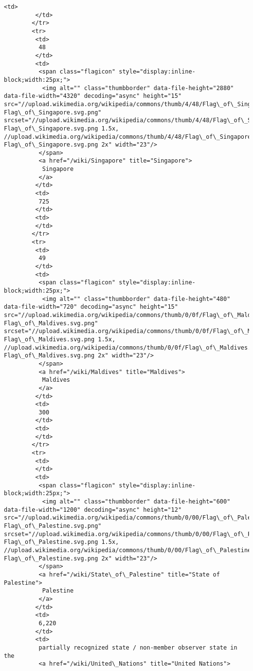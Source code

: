 \documentclass[11pt]{article}
\begin{document}
\begin{Verbatim}[commandchars=\\\{\}]
         <td>
         </td>
        </tr>
        <tr>
         <td>
          48
         </td>
         <td>
          <span class="flagicon" style="display:inline-block;width:25px;">
           <img alt="" class="thumbborder" data-file-height="2880" data-file-width="4320" decoding="async" height="15" src="//upload.wikimedia.org/wikipedia/commons/thumb/4/48/Flag\_of\_Singapore.svg/23px-Flag\_of\_Singapore.svg.png" srcset="//upload.wikimedia.org/wikipedia/commons/thumb/4/48/Flag\_of\_Singapore.svg/35px-Flag\_of\_Singapore.svg.png 1.5x, //upload.wikimedia.org/wikipedia/commons/thumb/4/48/Flag\_of\_Singapore.svg/45px-Flag\_of\_Singapore.svg.png 2x" width="23"/>
          </span>
          <a href="/wiki/Singapore" title="Singapore">
           Singapore
          </a>
         </td>
         <td>
          725
         </td>
         <td>
         </td>
        </tr>
        <tr>
         <td>
          49
         </td>
         <td>
          <span class="flagicon" style="display:inline-block;width:25px;">
           <img alt="" class="thumbborder" data-file-height="480" data-file-width="720" decoding="async" height="15" src="//upload.wikimedia.org/wikipedia/commons/thumb/0/0f/Flag\_of\_Maldives.svg/23px-Flag\_of\_Maldives.svg.png" srcset="//upload.wikimedia.org/wikipedia/commons/thumb/0/0f/Flag\_of\_Maldives.svg/35px-Flag\_of\_Maldives.svg.png 1.5x, //upload.wikimedia.org/wikipedia/commons/thumb/0/0f/Flag\_of\_Maldives.svg/45px-Flag\_of\_Maldives.svg.png 2x" width="23"/>
          </span>
          <a href="/wiki/Maldives" title="Maldives">
           Maldives
          </a>
         </td>
         <td>
          300
         </td>
         <td>
         </td>
        </tr>
        <tr>
         <td>
         </td>
         <td>
          <span class="flagicon" style="display:inline-block;width:25px;">
           <img alt="" class="thumbborder" data-file-height="600" data-file-width="1200" decoding="async" height="12" src="//upload.wikimedia.org/wikipedia/commons/thumb/0/00/Flag\_of\_Palestine.svg/23px-Flag\_of\_Palestine.svg.png" srcset="//upload.wikimedia.org/wikipedia/commons/thumb/0/00/Flag\_of\_Palestine.svg/35px-Flag\_of\_Palestine.svg.png 1.5x, //upload.wikimedia.org/wikipedia/commons/thumb/0/00/Flag\_of\_Palestine.svg/46px-Flag\_of\_Palestine.svg.png 2x" width="23"/>
          </span>
          <a href="/wiki/State\_of\_Palestine" title="State of Palestine">
           Palestine
          </a>
         </td>
         <td>
          6,220
         </td>
         <td>
          partially recognized state / non-member observer state in the
          <a href="/wiki/United\_Nations" title="United Nations">

\end{Verbatim}
\end{document}
